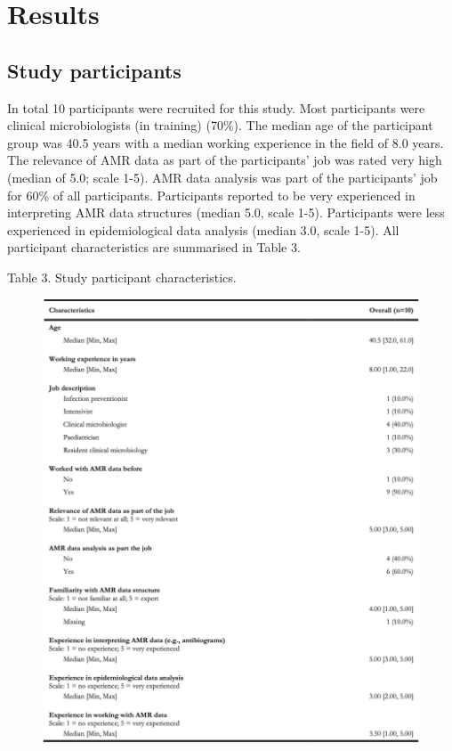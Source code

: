 \documentclass[
]{book}
\begin{document}
\hypertarget{results-1}{%
\section{Results}\label{results-1}}

\hypertarget{study-participants-1}{%
\subsection{Study participants}\label{study-participants-1}}

In total 10 participants were recruited for this study. Most participants were clinical microbiologists (in training) (70\%). The median age of the participant group was 40.5 years with a median working experience in the field of 8.0 years. The relevance of AMR data as part of the participants' job was rated very high (median of 5.0; scale 1-5). AMR data analysis was part of the participants' job for 60\% of all participants. Participants reported to be very experienced in interpreting AMR data structures (median 5.0, scale 1-5). Participants were less experienced in epidemiological data analysis (median 3.0, scale 1-5). All participant characteristics are summarised in Table 3.

Table 3. Study participant characteristics.

\begin{figure}

{\centering \includegraphics[width=1\linewidth]{images/06-t03} 

}

\end{figure}
\end{document}
